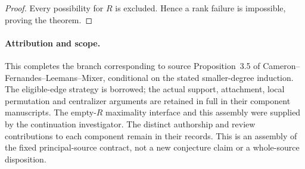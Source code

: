 \documentclass[11pt,a4paper]{article}
\begin{document}
\begin{proof}
Every possibility for $R$ is excluded. Hence a rank failure is
impossible, proving the theorem.
\end{proof}

\paragraph{Attribution and scope.}
This completes the branch corresponding to source Proposition~3.5
of Cameron--Fernandes--Leemans--Mixer, conditional on the stated
smaller-degree induction. The eligible-edge strategy is borrowed;
the actual support, attachment, local permutation and centralizer
arguments are retained in full in their component manuscripts.
The empty-$R$ maximality interface and this assembly were supplied
by the continuation investigator. The distinct authorship and
review contributions to each component remain in their records.
This is an assembly of the fixed principal-source contract, not
a new conjecture claim or a whole-source disposition.
\end{document}
